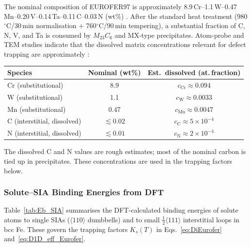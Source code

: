 \documentclass[pdflatex,sn-basic]{sn-jnl} %
\begin{document}
The nominal composition of EUROFER97 is approximately 8.9\,Cr--1.1\,W--0.47\,Mn--0.20\,V--0.14\,Ta--0.11\,C--0.03\,N (wt\%)
\citep{vanderschaaf2003,Aktaa2020}. After the standard heat treatment
(980$^\circ$C/30\,min normalisation $+$ 760$^\circ$C/90\,min tempering), a
substantial fraction of C, N, V, and Ta is consumed by $M_{23}C_6$ and
MX-type precipitates. Atom-probe and TEM studies indicate that the dissolved
matrix concentrations relevant for defect trapping are approximately
\citep{Klimenkov2009,Polekhina2023}:
\begin{center}
\begin{tabular}{lcc}
\toprule
Species & Nominal (wt\%) & Est.\ dissolved (at.\,fraction)\\
\midrule
Cr (substitutional)   & 8.9  & $c_{\mathrm{Cr}} \approx 0.094$\\
W  (substitutional)   & 1.1  & $c_{\mathrm{W}}  \approx 0.0033$\\
Mn (substitutional)   & 0.47 & $c_{\mathrm{Mn}} \approx 0.0047$\\
C  (interstitial, dissolved) & $\lesssim 0.02$ & $c_{\mathrm{C}} \approx 5\times10^{-4}$\\
N  (interstitial, dissolved) & $\lesssim 0.01$ & $c_{\mathrm{N}} \approx 2\times10^{-4}$\\
\bottomrule
\end{tabular}
\end{center}
The dissolved C and N values are rough estimates; most of the nominal carbon is
tied up in precipitates. These concentrations are used in the trapping factors
below.

\subsubsection{Solute--SIA Binding Energies from DFT}

Table~\ref{tab:Eb_SIA} summarises the DFT-calculated binding energies of
solute atoms to single SIAs ($\langle110\rangle$ dumbbells) and to small
$\frac{1}{2}\langle111\rangle$ interstitial loops in bcc Fe. These govern the
trapping factors $K_s(T)$ in Eqs.~\eqref{eq:DiEurofer}
and~\eqref{eq:D1D_eff_Eurofer}.
\end{document}
